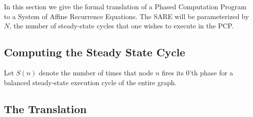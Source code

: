 In this section we give the formal translation of a Phased Computation
Program to a System of Affine Recurrence Equations.  The SARE will be
parameterized by $N$, the number of steady-state cycles that one
wishes to execute in the PCP.

\subsection{Computing the Steady State Cycle}

Let $S(n)$ denote the number of times that node $n$ fires its 0'th
phase for a balanced steady-state execution cycle of the entire graph.

\subsection{The Translation}

